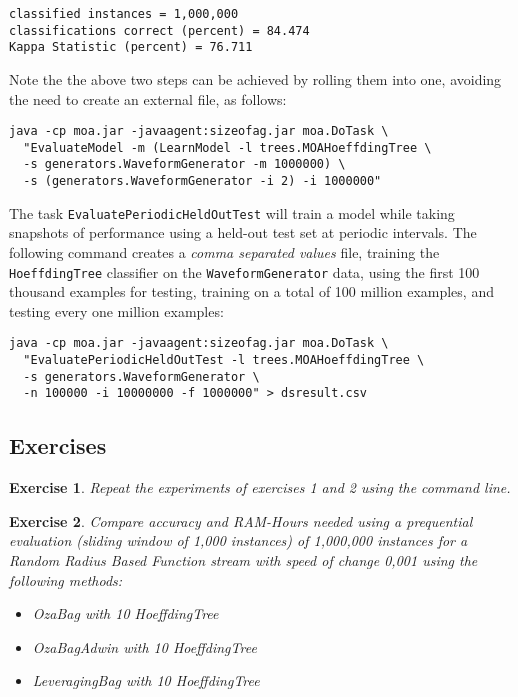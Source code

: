 \documentclass[a4paper,12pt]{article}
\newtheorem{exercise}{Exercise}{}
\begin{document}
\begin{verbatim}
classified instances = 1,000,000
classifications correct (percent) = 84.474
Kappa Statistic (percent) = 76.711
\end{verbatim}

Note the the above two steps can be achieved by rolling them into one, avoiding the need to create an external file, as follows:

\begin{verbatim}
java -cp moa.jar -javaagent:sizeofag.jar moa.DoTask \
  "EvaluateModel -m (LearnModel -l trees.MOAHoeffdingTree \
  -s generators.WaveformGenerator -m 1000000) \
  -s (generators.WaveformGenerator -i 2) -i 1000000"
\end{verbatim}

The task \verb+EvaluatePeriodicHeldOutTest+ will train a model while taking snapshots of performance using a held-out test set at periodic intervals.
The following command creates a {\em comma separated values} file, training the \verb+HoeffdingTree+ classifier on the \verb+WaveformGenerator+ data, using the first 100 thousand examples for testing, training on a total of 100 million examples, and testing every one million examples:

\begin{verbatim}
java -cp moa.jar -javaagent:sizeofag.jar moa.DoTask \
  "EvaluatePeriodicHeldOutTest -l trees.MOAHoeffdingTree \
  -s generators.WaveformGenerator \
  -n 100000 -i 10000000 -f 1000000" > dsresult.csv
\end{verbatim}

\subsection{Exercises}
\begin{exercise}
Repeat the experiments of exercises 1 and 2 using the command line.  
\end{exercise}

\begin{exercise}
Compare accuracy and RAM-Hours needed using a prequential evaluation (sliding window of 1,000 instances) of 1,000,000 instances for a Random Radius Based Function stream with speed of change 0,001 using the following methods:
\begin{itemize}
 \item OzaBag with 10 HoeffdingTree
 \item OzaBagAdwin with 10 HoeffdingTree
 \item LeveragingBag with 10 HoeffdingTree
\end{itemize}
\end{exercise}
\end{document}
